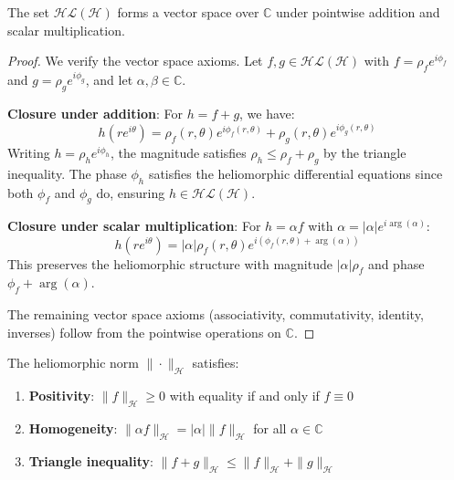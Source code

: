 \begin{lemma}
\label{lem:heliomorphic_vector_space}
The set $\mathcal{HL}(\mathcal{H})$ forms a vector space over $\mathbb{C}$ under pointwise addition and scalar multiplication.
\end{lemma}

\begin{proof}
We verify the vector space axioms. Let $f, g \in \mathcal{HL}(\mathcal{H})$ with $f = \rho_f e^{i\phi_f}$ and $g = \rho_g e^{i\phi_g}$, and let $\alpha, \beta \in \mathbb{C}$.

\textbf{Closure under addition}: For $h = f + g$, we have:
\begin{equation}
h(re^{i\theta}) = \rho_f(r,\theta)e^{i\phi_f(r,\theta)} + \rho_g(r,\theta)e^{i\phi_g(r,\theta)}
\end{equation}
Writing $h = \rho_h e^{i\phi_h}$, the magnitude satisfies $\rho_h \leq \rho_f + \rho_g$ by the triangle inequality. The phase $\phi_h$ satisfies the heliomorphic differential equations since both $\phi_f$ and $\phi_g$ do, ensuring $h \in \mathcal{HL}(\mathcal{H})$.

\textbf{Closure under scalar multiplication}: For $h = \alpha f$ with $\alpha = |\alpha|e^{i\arg(\alpha)}$:
\begin{equation}
h(re^{i\theta}) = |\alpha|\rho_f(r,\theta)e^{i(\phi_f(r,\theta) + \arg(\alpha))}
\end{equation}
This preserves the heliomorphic structure with magnitude $|\alpha|\rho_f$ and phase $\phi_f + \arg(\alpha)$.

The remaining vector space axioms (associativity, commutativity, identity, inverses) follow from the pointwise operations on $\mathbb{C}$.
\end{proof}

\begin{lemma}
\label{lem:heliomorphic_norm_properties}
The heliomorphic norm $\|\cdot\|_{\mathcal{H}}$ satisfies:
\begin{enumerate}
\item \textbf{Positivity}: $\|f\|_{\mathcal{H}} \geq 0$ with equality if and only if $f \equiv 0$
\item \textbf{Homogeneity}: $\|\alpha f\|_{\mathcal{H}} = |\alpha| \|f\|_{\mathcal{H}}$ for all $\alpha \in \mathbb{C}$
\item \textbf{Triangle inequality}: $\|f + g\|_{\mathcal{H}} \leq \|f\|_{\mathcal{H}} + \|g\|_{\mathcal{H}}$
\end{enumerate}
\end{lemma}

